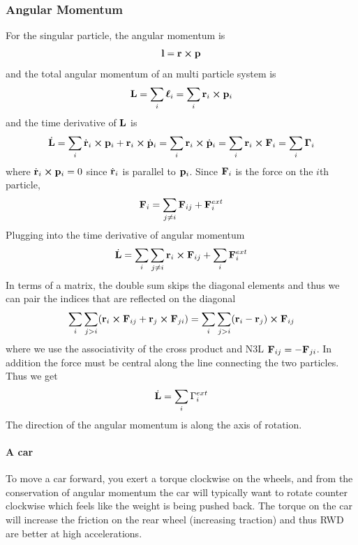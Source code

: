 \documentclass[../main.tex]{subfiles}
\begin{document}
\subsubsection*{Angular Momentum}
For the singular particle, the angular momentum is
\begin{align*}
    \vb{l} = \vb{r} \cross \vb{p}
\end{align*}
and the total angular momentum of an multi particle system is
\begin{align*}
    \vb{L} = \sum_i \vb*{\ell}_i = \sum_i \vb{r}_i \cross \vb{p}_i
\end{align*}
and the time derivative of $\vb{L}$ is
\begin{align*}
    \dot{\vb{L}} = \sum_i \dot{\vb{r}}_i \cross \vb{p}_i + \vb{r}_i \cross \dot{\vb{p}}_i
    = \sum_i \vb{r}_i \cross \dot{\vb{p}}_i = \sum_i \vb{r}_i \cross \vb{F}_i = \sum_i \vb{\Gamma}_i
\end{align*}
where $\dot{\vb{r}}_i \cross \vb{p}_i = 0$ since $\dot{\vb{r}}_i$ is parallel to $\vb{p}_i$. Since
$\vb{F}_i$ is the force on the $i$th particle,
\begin{align*}
    \vb{F}_i = \sum_{j\neq i} \vb{F}_{ij} + \vb{F}_i^{ext}
\end{align*}
Plugging into the time derivative of angular momentum
\begin{align*}
    \dot{\vb L} = \sum_i \sum_{j\neq i} \vb{r}_i \cross \vb{F}_{ij} + \sum_i \vb{F}_i^{ext}
\end{align*}
In terms of a matrix, the double sum skips the diagonal elements and thus we can pair the indices
that are reflected on the diagonal
\begin{align*}
    \sum_i \sum_{j > i} (\vb r_i \cross \vb F_{ij} + \vb r_j \cross \vb F_{ji}) = \sum_i \sum_{j > i}
    (\vb r_i - \vb r_j) \cross \vb F_{ij}
\end{align*}
where we use the associativity of the cross product and N3L $\vb{F}_{ij} = -\vb{F}_{ji}$. In
addition the force must be central along the line connecting the two particles. Thus we get
\begin{align*}
    \dot{\vb L} = \sum_i \Gamma_i^{ext}
\end{align*}
The direction of the angular momentum is along the axis of rotation. 

\paragraph{A car} To move a car forward, you exert a torque clockwise on the wheels, and from the 
conservation of angular momentum the car will typically want to rotate counter clockwise which feels
like the weight is being pushed back. The torque on the car will increase the friction on the rear
wheel (increasing traction) and thus RWD are better at high accelerations.
\end{document}
